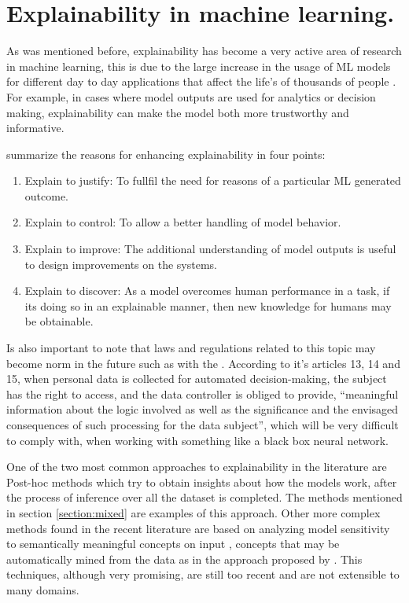 \section{ Explainability in machine learning.}

As was mentioned before, explainability has become a very active area of research
in machine learning, this is due to the large increase in the usage of ML models
for different day to day applications that affect the life's of thousands of people
\cite{ras_explanation}. For example, in cases where model outputs are used for analytics or decision
making, explainability can make the model both more trustworthy and informative.

 summarize the reasons for enhancing explainability in four points:

\begin{enumerate}
	\item Explain to justify: To fullfil the need for reasons of a particular ML
	generated outcome.
	\item Explain to control: To allow a better handling of model behavior.
	\item Explain to improve: The additional understanding of model outputs is useful
	to design improvements on the systems.
	\item Explain to discover: As a model overcomes human performance in a task, if its
	doing so in an explainable manner, then new knowledge for humans may be obtainable.

\end{enumerate}

Is also important to note that laws and regulations related to this topic may become norm
in the future such as with the . According to it's articles
13, 14 and 15, when personal data is collected for automated decision-making,
the subject has the right to access, and the data controller is obliged to provide,
“meaningful information about the logic involved  as well as the significance and the envisaged
consequences of such processing for the data subject”, which will be very difficult to comply with,
when working with something like a black box neural network.

One of the two most common approaches to explainability in the literature are Post-hoc methods
\cite{adadi_xai} which try to obtain insights about how the models work, after the process of
inference over all the dataset is completed. The methods mentioned in section
\ref{section:mixed} are examples of this approach. Other more complex methods found in the recent literature
are based on analyzing model sensitivity to semantically meaningful concepts on input \cite{kim_tcav, shi_concept},
concepts that may be automatically mined from the data as in the approach proposed by . This techniques, although
very promising, are still too recent and are not extensible to many domains.

